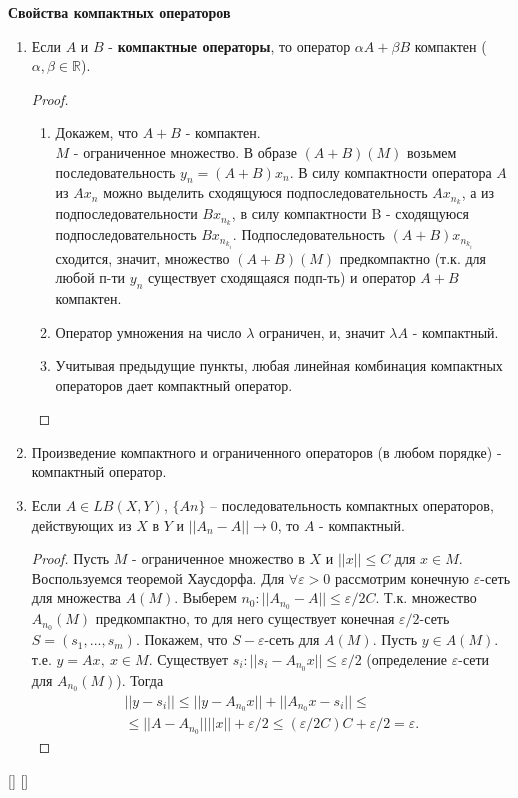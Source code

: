 \bigbreak
\textbf{Свойства компактных операторов}
\begin{enumerate}
    \item Если $A$ и $B$ - \textbf{компактные операторы}, то оператор $\alpha A+ \beta B$ компактен ($\alpha, \beta \in \mathbb{R}$).
    \begin{proof}
        \begin{enumerate}
            
            \item Докажем, что $A+B$ - компактен. \\ 
            \mathLet $M$ - ограниченное множество. В образе $(A+B)(M)$ возьмем последовательность $y_n = (A+B)x_n$. В силу компактности оператора $A$ из $Ax_n$ можно выделить сходящуюся подпоследовательность $Ax_{n_k}$, а из подпоследовательности $Bx_{n_k}$, в силу компактности B - сходящуюся подпоследовательность $Bx_{n_{k_i}}$. Подпоследовательность $(A+B)x_{n_{k_i}}$ сходится, значит, множество $(A+B)(M)$ предкомпактно (т.к. для любой п-ти $y_n$ существует сходящаяся подп-ть) и оператор $A+B$ компактен.

            \item Оператор умножения на число $\lambda$ ограничен, и, значит $\lambda A$ - компактный.

            \item Учитывая предыдущие пункты, любая линейная комбинация компактных операторов дает компактный оператор.
        \end{enumerate}
        
    \end{proof}

    \item Произведение компактного и ограниченного операторов (в любом порядке) - компактный оператор.


    \item Если $A \in LB(X,Y)$, $\{An\}$ – последовательность компактных операторов, действующих из $X$ в $Y$ и $||A_n - A|| \rightarrow 0$, то $A$ - компактный.
    \begin{proof}
        Пусть $M$ - ограниченное множество в $X$ и $||x|| \le C \text{ для } x \in M$.
        Воспользуемся теоремой Хаусдорфа. Для $\forall \varepsilon > 0$ рассмотрим конечную $\varepsilon$-сеть для множества $A(M)$. Выберем $n_0: ||A_{n_0} - A|| \le \varepsilon/2C$. Т.к. множество $A_{n_0}(M)$ предкомпактно, то для него существует конечная $\varepsilon/2$-сеть $S = (s_1, ..., s_m).$ Покажем, что $S - \varepsilon$-сеть для $A(M)$. Пусть $y \in A(M)$. т.е. $y = Ax, \ x \in M$. Существует $s_i: ||s_i - A_{n_0}x|| \le \varepsilon/2$ (определение $\varepsilon$-сети для $A_{n_0}(M)$). Тогда
        \begin{align*}
            ||y-s_i|| \le ||y - A_{n_0}x|| + ||A_{n_0}x - s_i|| \le \\
            \le ||A - A_{n_0}|| ||x|| + \varepsilon/2 \le (\varepsilon/2C)C + \varepsilon/2 = \varepsilon .
        \end{align*}
    \end{proof}
\end{enumerate}

[\cite{funcan_spring}]
[\cite{funcan_antonevich}]
